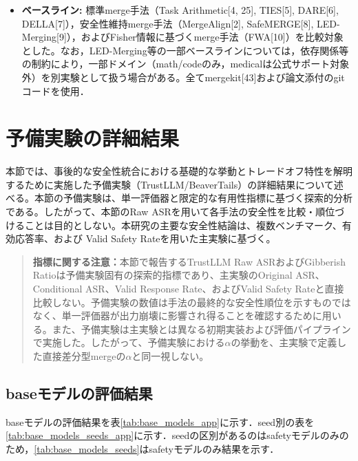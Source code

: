 \documentclass{article}
\begin{document}
\begin{itemize}
\begin{itemize}
        本文では、各手法の探索軌跡全体を用いたパレート分析に加え、比較の可読性のため代表的なmerge強度として$\alpha=0.6$の結果を提示する。ハイパーパラメータ調整を伴わないベースライン（SafeMERGE, MergeAlign等）は既定設定（$\alpha=\mathrm{N/A}$）で評価。
    \end{itemize}
    \item \textbf{ベースライン:}
    標準merge手法（Task Arithmetic[4, 25], TIES[5], DARE[6], DELLA[7]），安全性維持merge手法（MergeAlign[2], SafeMERGE[8], LED-Merging[9]），およびFisher情報に基づくmerge手法（FWA[10]）を比較対象とした。なお，LED-Merging等の一部ベースラインについては，依存関係等の制約により，一部ドメイン（math/codeのみ，medicalは公式サポート対象外）を別実験として扱う場合がある。全てmergekit[43]および論文添付のgitコードを使用．
\end{itemize}


\section{予備実験の詳細結果}
\label{app:予備実験の詳細結果}
本節では、事後的な安全性統合における基礎的な挙動とトレードオフ特性を解明するために実施した予備実験（TrustLLM/BeaverTails）の詳細結果について述べる。本節の予備実験は、単一評価器と限定的な有用性指標に基づく探索的分析である。したがって、本節のRaw ASRを用いて各手法の安全性を比較・順位づけることは目的としない。本研究の主要な安全性結論は、複数ベンチマーク、有効応答率、および Valid Safety Rateを用いた主実験に基づく。

\begin{quote}
\textbf{指標に関する注意：}本節で報告するTrustLLM Raw ASRおよびGibberish Ratioは予備実験固有の探索的指標であり、主実験のOriginal ASR、Conditional ASR、Valid Response Rate、およびValid Safety Rateと直接比較しない。予備実験の数値は手法の最終的な安全性順位を示すものではなく、単一評価器が出力崩壊に影響され得ることを確認するために用いる。また、予備実験は主実験とは異なる初期実装および評価パイプラインで実施した。したがって、予備実験における\(\alpha\)の挙動を、主実験で定義した直接差分型mergeの\(\alpha\)と同一視しない。
\end{quote}


\subsection{baseモデルの評価結果}

baseモデルの評価結果を表\ref{tab:base_models_app}に示す．seed別の表を\ref{tab:base_models_seeds_app}に示す．seedの区別があるのはsafetyモデルのみのため，\ref{tab:base_models_seeds}はsafetyモデルのみ結果を示す．
\end{document}
